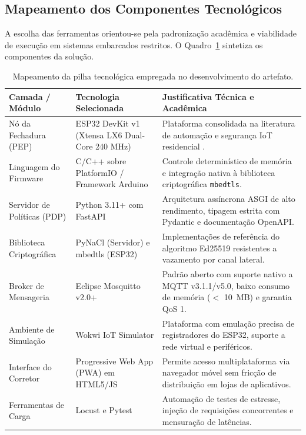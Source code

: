 \subsection{Mapeamento dos Componentes Tecnológicos}
\label{subsec:mapeamento-stack}

A escolha das ferramentas orientou-se pela padronização acadêmica e viabilidade de execução em sistemas embarcados restritos. O Quadro~\ref{quadro:stack-tecnologica} sintetiza os componentes da solução.

\begin{table}[htbp]
\centering
\footnotesize
\caption{Mapeamento da pilha tecnológica empregada no desenvolvimento do artefato.}
\label{quadro:stack-tecnologica}
\begin{tabularx}{\textwidth}{p{2.8cm} p{4.2cm} X}
\toprule
\textbf{Camada / Módulo} & \textbf{Tecnologia Selecionada} & \textbf{Justificativa Técnica e Acadêmica} \\
\midrule
Nó da Fechadura (PEP) & ESP32 DevKit v1 (Xtensa LX6 Dual-Core 240 MHz) & Plataforma consolidada na literatura de automação e segurança IoT residencial \cite{vardakis2024}. \\
Linguagem do Firmware & C/C++ sobre PlatformIO / Framework Arduino & Controle determinístico de memória e integração nativa à biblioteca criptográfica \texttt{mbedtls}. \\
Servidor de Políticas (PDP) & Python 3.11+ com FastAPI & Arquitetura assíncrona ASGI de alto rendimento, tipagem estrita com Pydantic e documentação OpenAPI. \\
Biblioteca Criptográfica & PyNaCl (Servidor) e mbedtls (ESP32) & Implementações de referência do algoritmo Ed25519 resistentes a vazamento por canal lateral. \\
Broker de Mensageria & Eclipse Mosquitto v2.0+ & Padrão aberto com suporte nativo a MQTT v3.1.1/v5.0, baixo consumo de memória ($<$ 10~MB) e garantia QoS 1. \\
Ambiente de Simulação & Wokwi IoT Simulator & Plataforma com emulação precisa de registradores do ESP32, suporte a rede virtual e periféricos. \\
Interface do Corretor & Progressive Web App (PWA) em HTML5/JS & Permite acesso multiplataforma via navegador móvel sem fricção de distribuição em lojas de aplicativos. \\
Ferramentas de Carga & Locust e Pytest & Automação de testes de estresse, injeção de requisições concorrentes e mensuração de latências. \\
\bottomrule
\end{tabularx}
\end{table}

